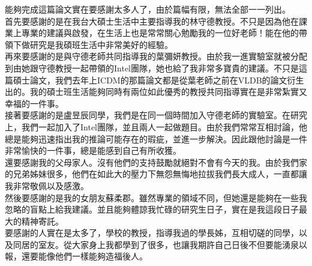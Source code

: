 \begin{acknowledgementsCH}

能夠完成這篇論文實在要感謝太多人了，由於篇幅有限，無法全部一一列出。
\\
首先要感謝的是在我台大碩士生活中主要指導我的林守德教授。不只是因為他在課業上專業的建議與啟發，在生活上也是常常關心勉勵我的一位好老師！能在他的帶領下做研究是我碩班生活中非常美好的經驗。
\\
再來要感謝的是與守德老師共同指導我的葉彌妍教授。由於我一進實驗室就被分配到由她跟守德教授一起帶領的Intel團隊，她也給了我非常多寶貴的建議。不只是這篇碩士論文，我們去年上ICDM的那篇論文都是從葉老師之前在VLDB的論文衍生出的。我的碩士班生活能夠同時有兩位如此優秀的教授共同指導實在是非常紮實又幸福的一件事。
\\
接著要感謝的是盧昱辰同學，我們是在同一個時間加入守德老師的實驗室。在研究上，我們一起加入了Intel團隊，並且兩人一起做題目。由於我們常常互相討論，他總是能夠迅速指出我的推論可能存在的瑕疵，並進一步解決。因此跟他討論是一件非常愉快的一件事，總是能感到自己有所收獲。
\\
還要感謝我的父母家人。沒有他們的支持鼓勵就絕對不會有今天的我。由於我們家的兄弟姊妹很多，他們在如此大的壓力下無怨無悔地拉拔我們長大成人，一直都讓我非常敬佩以及感激。
\\
然後要感謝的是我的女朋友蘇柔郡。雖然專業的領域不同，但她還是能夠在一些我忽略的盲點上給我建議。並且能夠體諒我忙碌的研究生日子，實在是我這段日子最大的精神寄託。
\\
要感謝的人實在是太多了，學校的教授，指導我過的學長姊，互相切磋的同學，以及同居的室友。從大家身上我都學到了很多，也讓我期許自己日後不但要能湧泉以報，還要能像他們一樣能夠造福後人。

\end{acknowledgementsCH}